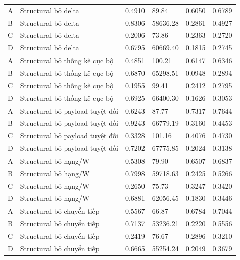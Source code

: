 \documentclass[12pt, a4paper, reqno, oneside]{book}
\begin{document}
{\begin{longtable}{P{1.1cm}P{4.9cm}P{1.6cm}P{2.2cm}P{1.6cm}P{1.6cm}}
A & Structural bỏ delta & 0.4910 & 89.84 & 0.6050 & 0.6789\\
B & Structural bỏ delta & 0.8306 & 58636.28 & 0.2861 & 0.4927\\
C & Structural bỏ delta & 0.2006 & 73.86 & 0.2363 & 0.2720\\
D & Structural bỏ delta & 0.6795 & 60669.40 & 0.1815 & 0.2745\\
A & Structural bỏ thống kê cục bộ & 0.4851 & 100.21 & 0.6147 & 0.6346\\
B & Structural bỏ thống kê cục bộ & 0.6870 & 65298.51 & 0.0948 & 0.2894\\
C & Structural bỏ thống kê cục bộ & 0.1955 & 99.41 & 0.2412 & 0.2795\\
D & Structural bỏ thống kê cục bộ & 0.6925 & 66400.30 & 0.1626 & 0.3053\\
A & Structural bỏ payload tuyệt đối & 0.6243 & 87.77 & 0.7317 & 0.7644\\
B & Structural bỏ payload tuyệt đối & 0.9243 & 66779.19 & 0.3160 & 0.4453\\
C & Structural bỏ payload tuyệt đối & 0.3328 & 101.16 & 0.4076 & 0.4730\\
D & Structural bỏ payload tuyệt đối & 0.7202 & 67775.85 & 0.2024 & 0.3138\\
A & Structural bỏ hạng/W & 0.5308 & 79.90 & 0.6507 & 0.6837\\
B & Structural bỏ hạng/W & 0.7998 & 59718.63 & 0.2425 & 0.5266\\
C & Structural bỏ hạng/W & 0.2650 & 75.73 & 0.3247 & 0.3420\\
D & Structural bỏ hạng/W & 0.6881 & 62056.45 & 0.1830 & 0.3446\\
A & Structural bỏ chuyển tiếp & 0.5567 & 66.87 & 0.6784 & 0.7044\\
B & Structural bỏ chuyển tiếp & 0.7137 & 53236.21 & 0.2220 & 0.5556\\
C & Structural bỏ chuyển tiếp & 0.2419 & 76.67 & 0.2896 & 0.3210\\
D & Structural bỏ chuyển tiếp & 0.6665 & 55254.24 & 0.2049 & 0.3679\\
\bottomrule\end{longtable}}
\end{document}
